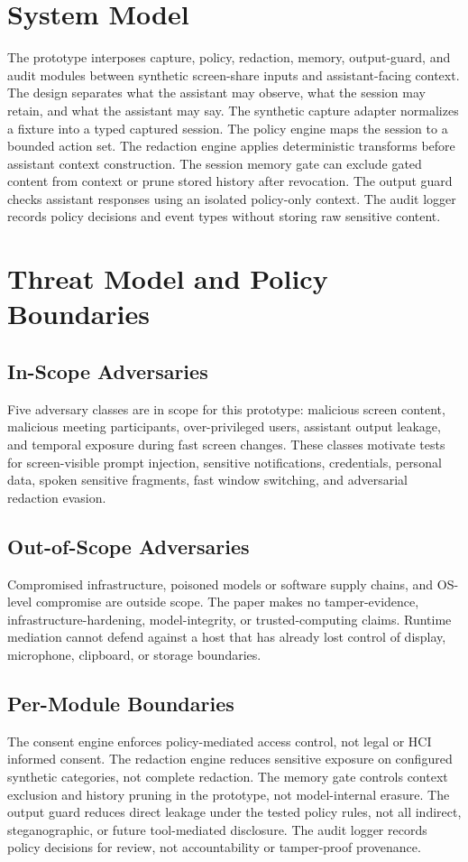 \documentclass[manuscript,review,anonymous]{acmart}
\begin{document}
\section{System Model}
The prototype interposes capture, policy, redaction, memory, output-guard, and audit modules between synthetic screen-share inputs and assistant-facing context.
The design separates what the assistant may observe, what the session may retain, and what the assistant may say.
The synthetic capture adapter normalizes a fixture into a typed captured session.
The policy engine maps the session to a bounded action set.
The redaction engine applies deterministic transforms before assistant context construction.
The session memory gate can exclude gated content from context or prune stored history after revocation.
The output guard checks assistant responses using an isolated policy-only context.
The audit logger records policy decisions and event types without storing raw sensitive content.

\section{Threat Model and Policy Boundaries}
\label{sec:threatmodel}

\subsection{In-Scope Adversaries}
Five adversary classes are in scope for this prototype: malicious screen content, malicious meeting participants, over-privileged users, assistant output leakage, and temporal exposure during fast screen changes.
These classes motivate tests for screen-visible prompt injection, sensitive notifications, credentials, personal data, spoken sensitive fragments, fast window switching, and adversarial redaction evasion.

\subsection{Out-of-Scope Adversaries}
Compromised infrastructure, poisoned models or software supply chains, and OS-level compromise are outside scope.
The paper makes no tamper-evidence, infrastructure-hardening, model-integrity, or trusted-computing claims.
Runtime mediation cannot defend against a host that has already lost control of display, microphone, clipboard, or storage boundaries.

\subsection{Per-Module Boundaries}
The consent engine enforces policy-mediated access control, not legal or HCI informed consent.
The redaction engine reduces sensitive exposure on configured synthetic categories, not complete redaction.
The memory gate controls context exclusion and history pruning in the prototype, not model-internal erasure.
The output guard reduces direct leakage under the tested policy rules, not all indirect, steganographic, or future tool-mediated disclosure.
The audit logger records policy decisions for review, not accountability or tamper-proof provenance.
\end{document}
